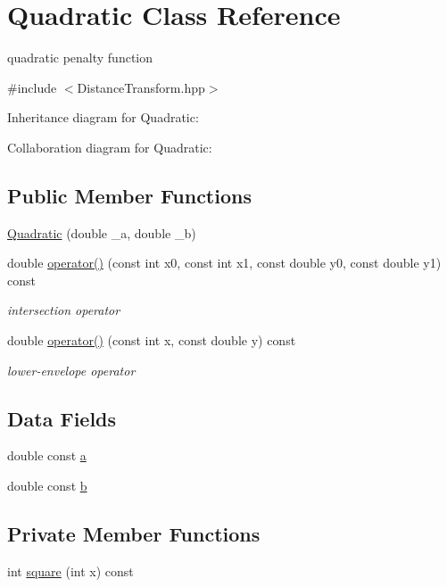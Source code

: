 \hypertarget{classQuadratic}{}\section{Quadratic Class Reference}
\label{classQuadratic}


quadratic penalty function  




{\ttfamily \#include $<$Distance\+Transform.\+hpp$>$}



Inheritance diagram for Quadratic\+:


Collaboration diagram for Quadratic\+:
\subsection*{Public Member Functions}
\begin{DoxyCompactItemize}
\item 
\hyperlink{classQuadratic_aa5d5e8e58a9d0aaf332e6b8b879430b8}{Quadratic} (double \+\_\+a, double \+\_\+b)
\item 
double \hyperlink{classQuadratic_ad074fa92b51e0590f6621b60ac01219a}{operator()} (const int x0, const int x1, const double y0, const double y1) const 
\begin{DoxyCompactList}\small\item\em intersection operator \end{DoxyCompactList}\item 
double \hyperlink{classQuadratic_ae1f3f6d71209aafe6bb1636a8c17489c}{operator()} (const int x, const double y) const 
\begin{DoxyCompactList}\small\item\em lower-\/envelope operator \end{DoxyCompactList}\end{DoxyCompactItemize}
\subsection*{Data Fields}
\begin{DoxyCompactItemize}
\item 
double const \hyperlink{classQuadratic_a3784ebac36b04b9195d44d6d5bc8933a}{a}
\item 
double const \hyperlink{classQuadratic_a1df1154ac27afe4533b5b695831ed23a}{b}
\end{DoxyCompactItemize}
\subsection*{Private Member Functions}
\begin{DoxyCompactItemize}
\item 
int \hyperlink{classQuadratic_a0fd7e9cc0ce3028a7db656ec0cb8f84f}{square} (int x) const 
\end{DoxyCompactItemize}


